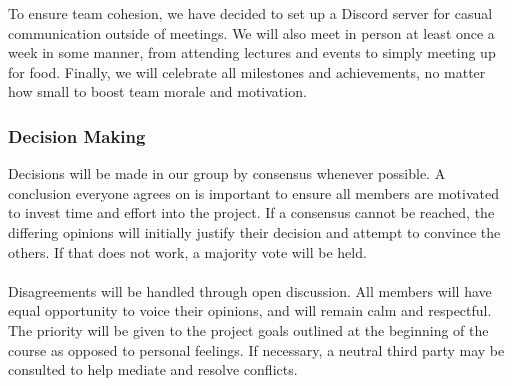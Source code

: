 \documentclass{article}
\begin{document}
To ensure team cohesion, we have decided to set up a Discord server for casual communication outside of meetings. We will also meet in person at least once a week in some manner, from attending lectures and events to simply meeting up for food. Finally, we will celebrate all milestones and achievements, no matter how small to boost team morale and motivation.

\subsubsection*{Decision Making}

Decisions will be made in our group by consensus whenever possible. A conclusion everyone agrees on is important to ensure all members are motivated to invest time and effort into the project. If a consensus cannot be reached, the differing opinions will initially justify their decision and attempt to convince the others. If that does not work, a majority vote will be held.\\\\ Disagreements will be handled through open discussion. All members will have equal opportunity to voice their opinions, and will remain calm and respectful. The priority will be given to the project goals outlined at the beginning of the course as opposed to personal feelings. If necessary, a neutral third party may be consulted to help mediate and resolve conflicts.
\end{document}
